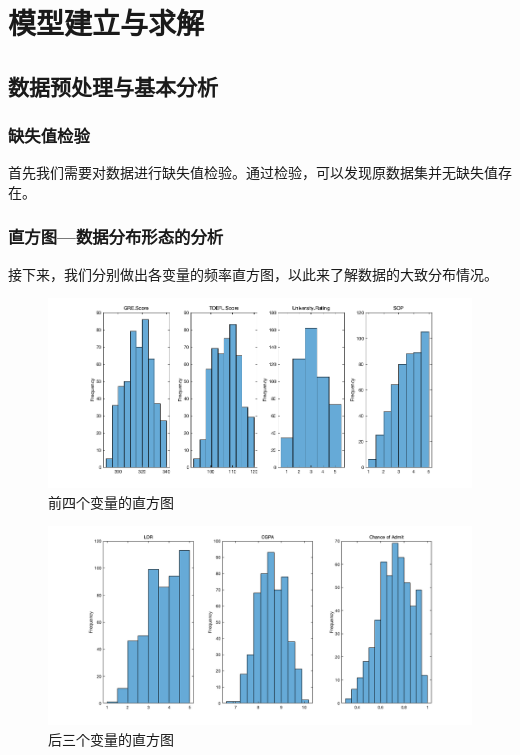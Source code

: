 \documentclass[11pt]{article}
\begin{document}
\section{模型建立与求解}
\subsection{数据预处理与基本分析}
\subsubsection*{缺失值检验}
首先我们需要对数据进行缺失值检验。通过检验，可以发现原数据集并无缺失值存在。
\subsubsection*{直方图---数据分布形态的分析}
接下来，我们分别做出各变量的频率直方图，以此来了解数据的大致分布情况。
\begin{figure}[H]
	\centering
	\caption{前四个变量的直方图}
	\includegraphics[scale=0.43]{images/histgraph1.png}
\end{figure}
\begin{figure}[H]
	\centering
	\caption{后三个变量的直方图}
	\includegraphics[scale=0.35]{images/histgraph2.png}
\end{figure}
\end{document}
